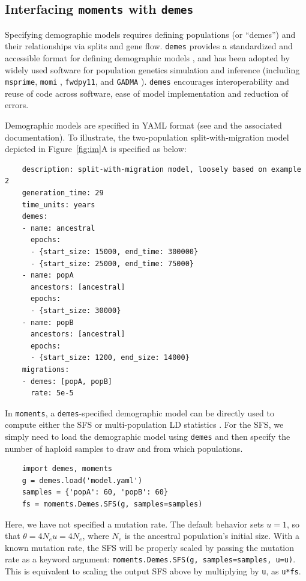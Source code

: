 \documentclass[]{article}
\newcommand{\moments}{\texttt{moments}\xspace}
\newcommand{\demes}{\texttt{demes}\xspace}
\newcommand{\msprime}{\texttt{msprime}\xspace}
\newcommand{\momi}{\texttt{momi}\xspace}
\newcommand{\fwdpy}{\texttt{fwdpy11}\xspace}
\begin{document}
\subsection*{Interfacing \moments with \demes}

Specifying demographic models requires defining populations (or ``demes'') and
their relationships via splits and gene flow. \demes provides a standardized
and accessible format for defining demographic models \citep{gower2022demes},
and has been adopted by widely used software for population genetics simulation
and inference (including \msprime \citep{baumdicker2022efficient}, \momi
\citep{dilber2024faster}, \fwdpy \citep{thornton2019polygenic}, and
\texttt{GADMA} \citep{noskova2023gadma2}). \demes encourages interoperability
and reuse of code across software, ease of model implementation and reduction
of errors.

Demographic models are specified in YAML format (see \citet{gower2022demes} and
the associated documentation). To illustrate, the two-population
split-with-migration model depicted in Figure~\ref{fig:im}A is specified as
below:
\begin{verbatim}
    description: split-with-migration model, loosely based on example 2
    generation_time: 29
    time_units: years
    demes:
    - name: ancestral
      epochs:
      - {start_size: 15000, end_time: 300000}
      - {start_size: 25000, end_time: 75000}
    - name: popA
      ancestors: [ancestral]
      epochs:
      - {start_size: 30000}
    - name: popB
      ancestors: [ancestral]
      epochs:
      - {start_size: 1200, end_size: 14000}
    migrations:
    - demes: [popA, popB]
      rate: 5e-5
\end{verbatim}

In \moments, a \demes-specified demographic model can be directly used to
compute either the SFS or multi-population LD statistics
\citep{ragsdale2019models, ragsdale2020unbiased}. For the SFS, we simply need
to load the demographic model using \demes and then specify the number of
haploid samples to draw and from which populations.
\begin{verbatim}
    import demes, moments
    g = demes.load('model.yaml')
    samples = {'popA': 60, 'popB': 60}
    fs = moments.Demes.SFS(g, samples=samples)
\end{verbatim}
Here, we have not specified a mutation rate. The default behavior sets $u=1$,
so that $\theta = 4N_eu=4N_e$, where $N_e$ is the ancestral population's
initial size. With a known mutation rate, the SFS will be properly scaled by
passing the mutation rate as a keyword argument: \texttt{moments.Demes.SFS(g,
samples=samples, u=u)}. This is equivalent to scaling the output SFS above by
multiplying by \texttt{u}, as \texttt{u*fs}.
\end{document}

